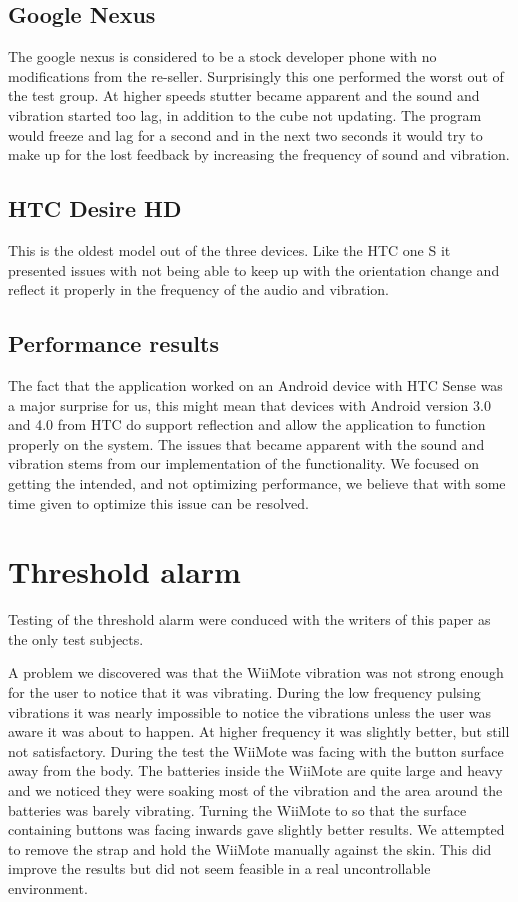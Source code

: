\subsection{Google Nexus}
The google nexus is considered to be a stock developer phone with no modifications from the re-seller. Surprisingly this one performed the worst out of the test group. At higher speeds stutter became apparent and the sound and vibration started too lag, in addition to the cube not updating. The program would freeze and lag for a second and in the next two seconds it would try to make up for the lost feedback by increasing the frequency of sound and vibration.

\subsection{HTC Desire HD}
This is the oldest model out of the three devices. Like the HTC one S it presented issues with not being able to keep up with the orientation change and reflect it properly in the frequency of the audio and vibration.

\subsection{Performance results}
The fact that the application worked on an Android device with HTC Sense was a major surprise for us, this might mean that devices with Android version 3.0 and 4.0 from HTC do support reflection and allow the application to function properly on the system. The issues that became apparent with the sound and vibration stems from our implementation of the functionality. We focused on getting the intended, and not optimizing performance, we believe that with some time given to optimize this issue can be resolved.

\section{Threshold alarm}
Testing of the threshold alarm were conduced with the writers of this paper as the only test subjects.

A problem we discovered was that the WiiMote vibration was not strong enough for the user to notice that it was vibrating. During the low frequency pulsing vibrations it was nearly impossible to notice the vibrations unless the user was aware it was about to happen. At higher frequency it was slightly better, but still not satisfactory. During the test the WiiMote was facing with the button surface away from the body. The batteries inside the WiiMote are quite large and heavy and we noticed they were soaking most of the vibration and the area around the batteries was barely vibrating. Turning the WiiMote to  so that the surface containing buttons was facing inwards gave slightly better results. We attempted to remove the strap and hold the WiiMote manually against the skin. This did improve the results but did not seem feasible in a real uncontrollable environment.